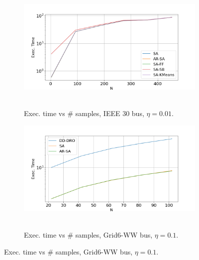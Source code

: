 \begin{figure}[hbt]
\begin{subfigure}{.50\textwidth}
  \centering
\hspace{10mm}\includegraphics[width=0.95\linewidth]{Dissertation/images/dynamic/ieee30/exec_time_N_453_eta_0.01.png}~~~~~~\hfill
  \caption{Exec. time vs $\#$ samples, IEEE 30 bus, $\eta = 0.01$.%
  }
  \label{fig:ieee30time}
\end{subfigure}
\begin{subfigure}{.50\textwidth}
  \centering
\hspace{10mm}\includegraphics[width=0.95\linewidth]{Dissertation/images/dynamic/grid6/dd-dro/exec_time_N_102_eta_0.1.png}~~~~~~\hfill
  \caption{Exec. time vs $\#$ samples, Grid6-WW bus, $\eta = 0.1$.%
}
\end{subfigure}
\end{figure}
